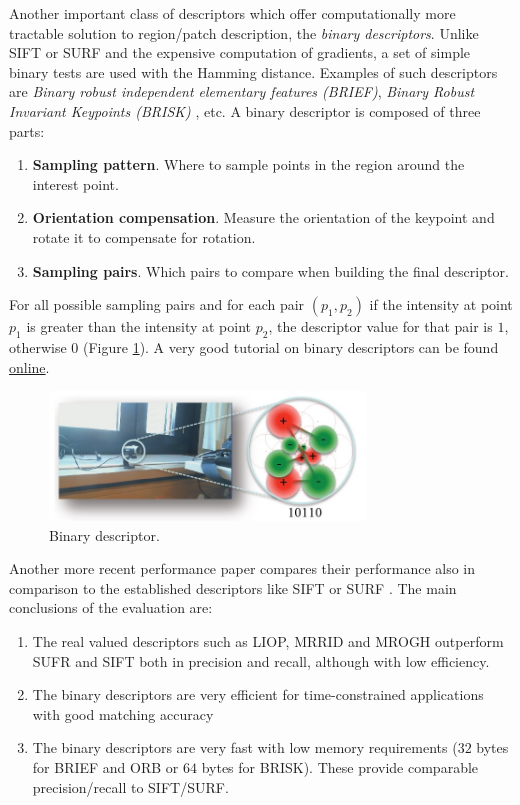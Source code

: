 Another important class of descriptors which offer computationally more tractable solution to region/patch description, the {\em binary descriptors}. Unlike SIFT or SURF and the expensive computation of gradients, a set of simple binary tests are used with the Hamming distance. Examples of such descriptors are {\em Binary robust independent elementary features (BRIEF)}\cite{Calonder:2010}, {\em Binary Robust Invariant Keypoints (BRISK)} \cite{Leutenegger:2011}, etc. A binary descriptor is composed of three parts:
\begin{enumerate}
\item{\bf Sampling pattern}. Where to sample points in the region around the interest point.
\item{\bf Orientation compensation}. Measure the orientation of the keypoint and rotate it to compensate for rotation.
\item{\bf Sampling pairs}. Which pairs to compare when building the final descriptor.
\end{enumerate}
For all possible sampling pairs and for each pair $(p_1, p_2)$ if the intensity at point $p_1$ is greater than the intensity at point $p_2$, the descriptor value for that pair is $1$, otherwise $0$ (Figure \ref{fig:bindescr}). A very good tutorial on binary descriptors can be found \href{https://gilscvblog.wordpress.com/?s=descriptors}{online}. 

\begin{figure}[H]
\begin{center}
\includegraphics[width=0.75\textwidth]{fig/BinDescr}
\end{center}
\caption{Binary descriptor.}
\label{fig:bindescr}
\end{figure}

Another more recent performance paper compares their performance also in comparison to the established descriptors like SIFT or SURF \cite{conf:icpr:MiksikM12}. The main conclusions of the evaluation are:
\begin{enumerate}
\item{The real valued descriptors such as LIOP, MRRID and MROGH outperform SUFR and SIFT both in precision and recall, although with low efficiency.}
\item{The binary descriptors are very efficient for time-constrained applications with good matching accuracy}
\item{The binary descriptors are very fast with low memory requirements ($32$ bytes for BRIEF and ORB or $64$ bytes for BRISK). These provide comparable precision/recall to SIFT/SURF.}
\end{enumerate}


